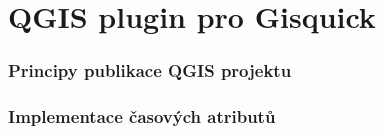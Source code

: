 
\newpage
\part{QGIS plugin pro Gisquick}
\newpage
\section{Principy publikace QGIS projektu}

\section{Implementace časových atributů}
